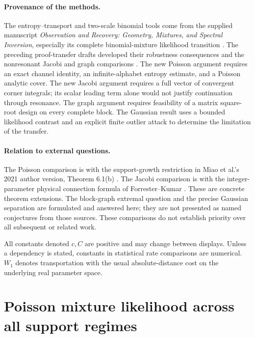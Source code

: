 \documentclass[11pt,a4paper]{article}
\theoremstyle{definition}
\theoremstyle{remark}
\numberwithin{equation}{section}
\begin{document}
\paragraph{Provenance of the methods.}
The entropy--transport and two-scale binomial tools come from the supplied
manuscript \emph{Observation and Recovery: Geometry, Mixtures, and Spectral
Inversion}, especially its complete binomial-mixture likelihood transition
\cite{p4:Keio029}. The preceding proof-transfer drafts developed their
robustness consequences and the nonresonant Jacobi and graph comparisons
\cite{p3:KeioPrevious2026,p4:KeioEntropy2026}. The new Poisson argument requires
an exact channel identity, an infinite-alphabet entropy estimate, and
a Poisson analytic cover. The new Jacobi argument requires a full vector
of convergent corner integrals; its scalar leading term alone would not
justify continuation through resonance. The graph argument requires
feasibility of a matrix square-root design on every complete block.
The Gaussian result uses a bounded likelihood contrast and an explicit
finite outlier attack to determine the limitation of the transfer.

\paragraph{Relation to external questions.}
The Poisson comparison is with the support-growth restriction in
Miao et al.'s 2021 author version, Theorem 6.1(b) \cite{p8:PC_Miao2021}.
The Jacobi comparison is with the integer-parameter physical connection
formula of Forrester--Kumar \cite{p8:SFB_FK}. These are concrete theorem
extensions. The block-graph extremal question and the precise Gaussian
separation are formulated and answered here; they are not presented as
named conjectures from those sources. These comparisons do not establish
priority over all subsequent or related work.

All constants denoted $c,C$ are positive and may change between displays.
Unless a dependency is stated, constants in statistical rate comparisons
are numerical. $W_1$ denotes transportation with the usual absolute-distance
cost on the underlying real parameter space.


\clearpage



\section{Poisson mixture likelihood across all support regimes}
\label{p4:pg:sec}
\end{document}
